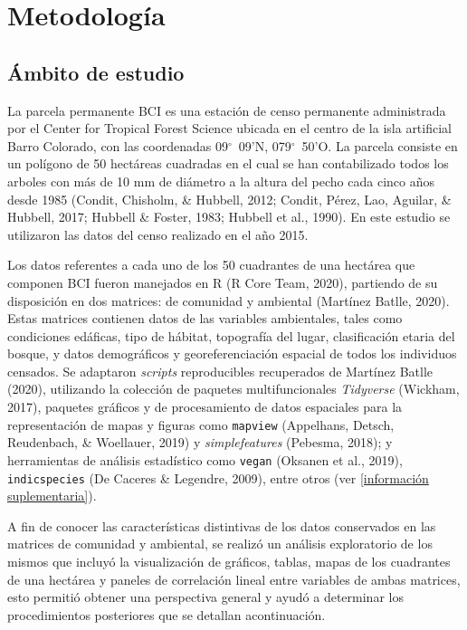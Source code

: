 \documentclass[11pt,]{article}
\begin{document}
\section{Metodología}\label{metodologuxeda}

\subsection{Ámbito de estudio}\label{uxe1mbito-de-estudio}

La parcela permanente BCI es una estación de censo permanente
administrada por el Center for Tropical Forest Science ubicada en el
centro de la isla artificial Barro Colorado, con las coordenadas
09\(^\circ\)~09'N, 079\(^\circ\)~50'O. La parcela consiste en un
polígono de 50 hectáreas cuadradas en el cual se han contabilizado todos
los arboles con más de 10 mm de diámetro a la altura del pecho cada
cinco años desde 1985 (Condit, Chisholm, \& Hubbell, 2012; Condit,
Pérez, Lao, Aguilar, \& Hubbell, 2017; Hubbell \& Foster, 1983; Hubbell
et al., 1990). En este estudio se utilizaron las datos del censo
realizado en el año 2015.

Los datos referentes a cada uno de los 50 cuadrantes de una hectárea que
componen BCI fueron manejados en R (R Core Team, 2020), partiendo de su
disposición en dos matrices: de comunidad y ambiental (Martínez Batlle,
2020). Estas matrices contienen datos de las variables ambientales,
tales como condiciones edáficas, tipo de hábitat, topografía del lugar,
clasificación etaria del bosque, y datos demográficos y
georeferenciación espacial de todos los individuos censados. Se
adaptaron \emph{scripts} reproducibles recuperados de Martínez Batlle
(2020), utilizando la colección de paquetes multifuncionales
\emph{Tidyverse} (Wickham, 2017), paquetes gráficos y de procesamiento
de datos espaciales para la representación de mapas y figuras como
\texttt{mapview} (Appelhans, Detsch, Reudenbach, \& Woellauer, 2019) y
\emph{simplefeatures} (Pebesma, 2018); y herramientas de análisis
estadístico como \texttt{vegan} (Oksanen et al., 2019),
\texttt{indicspecies} (De Caceres \& Legendre, 2009), entre otros (ver
\ref{información suplementaria}).

A fin de conocer las características distintivas de los datos
conservados en las matrices de comunidad y ambiental, se realizó un
análisis exploratorio de los mismos que incluyó la visualización de
gráficos, tablas, mapas de los cuadrantes de una hectárea y paneles de
correlación lineal entre variables de ambas matrices, esto permitió
obtener una perspectiva general y ayudó a determinar los procedimientos
posteriores que se detallan acontinuación.
\end{document}
